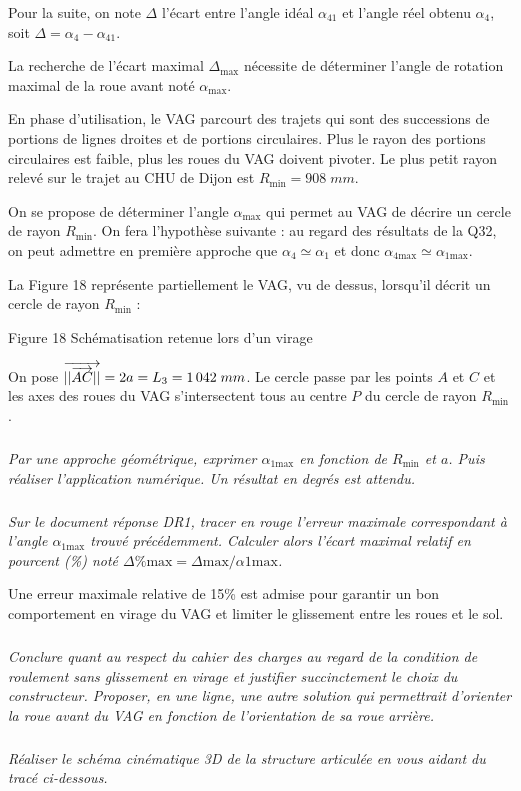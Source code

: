 \documentclass[10pt]{article}
\newif\ifprof
\begin{document}
Pour la suite, on note $\Delta$ l’écart entre l’angle idéal $\alpha_{41}$ et l’angle réel obtenu $\alpha_4$, soit $\Delta = \alpha_{4} - \alpha_{41}$.

La recherche de l’écart maximal $\Delta_{\text{max}}$ nécessite de déterminer l’angle de rotation maximal de la roue avant noté $\alpha_{\text{max}}$.

En phase d’utilisation, le VAG parcourt des trajets qui sont des successions de portions de lignes droites et de portions circulaires. Plus le rayon des portions circulaires est faible, plus les roues du VAG doivent pivoter. Le plus petit rayon relevé sur le trajet au CHU de Dijon est $R_{\text{min}} = 908\;mm$.

On se propose de déterminer l’angle $\alpha_{\text{max}}$ qui permet au VAG de décrire un cercle de rayon $R_{\text{min}}$. On fera l’hypothèse suivante : au regard des résultats de la Q32, on peut admettre en première approche que $\alpha_4\simeq\alpha_1$  et donc $\alpha_{\text{4max}} \simeq\alpha_{\text{1max}}$.

La Figure 18 représente partiellement le VAG, vu de dessus, lorsqu’il décrit un cercle de rayon $R_{\text{min}}$ :
 
Figure 18 Schématisation retenue lors d’un virage

On pose $\overrightarrow{||\overrightarrow{AC}||}=2a = L_3 =1\,042\; mm$. Le cercle passe par les points $A$ et $C$ et les axes des roues du VAG s’intersectent tous au centre $P$ du cercle de rayon $R_{\text{min}}$.

\subparagraph{}\textit{Par une approche géométrique, exprimer $\alpha_{\text{1max}}$ en fonction de $R_\text{min}$ et $a$. Puis réaliser l’application numérique. Un résultat en degrés est attendu.}
\subparagraph{}\textit{Sur le document réponse DR1, tracer en rouge l’erreur maximale  correspondant à l’angle $\alpha_{1\text{max}}$ trouvé précédemment. Calculer alors l’écart maximal relatif en pourcent (\%) noté $\Delta\%\text{max} = \Delta\text{max}/\alpha1\text{max}$.}

Une erreur maximale relative de 15\% est admise pour garantir un bon comportement en virage du VAG et limiter le glissement entre les roues et le sol.

\subparagraph{}\textit{Conclure quant au respect du cahier des charges au regard de la condition de roulement sans glissement en virage et justifier succinctement le choix du constructeur. Proposer, en une ligne, une autre solution qui permettrait d’orienter la roue avant du VAG en fonction de l’orientation de sa roue arrière.}




\subparagraph{}
\textit{Réaliser le schéma cinématique 3D de la structure articulée en vous aidant du tracé ci-dessous.}
\ifprof
\begin{corrige}
\begin{center}
\end{center}

\end{corrige}
\else
\begin{center}
\end{center}
\fi
\end{document}

